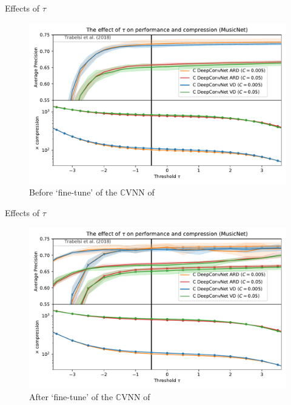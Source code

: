 \documentclass{beamer}
\newcommand{\cplx}{\mathbb{C}}
\begin{document}
\begin{frame}[c]{\insertsection}{Effects of $\tau$}
  \begin{figure}[t]
    \centering
    \includegraphics[width=\linewidth]{figure__musicnet__threshold.pdf}
    \\
    {Before `fine-tune' of the $\cplx$VNN of \citet{trabelsi_deep_2018}}
  \end{figure}

\end{frame}

\begin{frame}[c]{Effects of $\tau$}{\insertsection}
  \begin{figure}[t]
    \centering
    \includegraphics[width=\linewidth]{figure__musicnet__threshold__fine-tune.pdf}
    \\
    {After `fine-tune' of the $\cplx$VNN of \citet{trabelsi_deep_2018}}
  \end{figure}

\end{frame}
\end{document}
